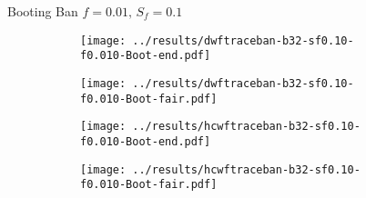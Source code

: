 \documentclass[10pt,a4paper]{beamer}
\begin{document}
	
\begin{frame}{Booting Ban $f=0.01,\, S_f=0.1$}
	\begin{figure}
		\begin{subfigure}{.48\textwidth}
			\centering
			\texttt{[image: ../results/dwftraceban-b32-sf0.10-f0.010-Boot-end.pdf]}
		\end{subfigure}
		\begin{subfigure}{.48\textwidth}
			\centering
			\texttt{[image: ../results/dwftraceban-b32-sf0.10-f0.010-Boot-fair.pdf]}
		\end{subfigure}
	\end{figure}

	\begin{figure}
	\begin{subfigure}{.48\textwidth}
		\centering
		\texttt{[image: ../results/hcwftraceban-b32-sf0.10-f0.010-Boot-end.pdf]}
	\end{subfigure}
	\begin{subfigure}{.48\textwidth}
		\centering
		\texttt{[image: ../results/hcwftraceban-b32-sf0.10-f0.010-Boot-fair.pdf]}
	\end{subfigure}
	\end{figure}
\end{frame}


%	
\end{document}
